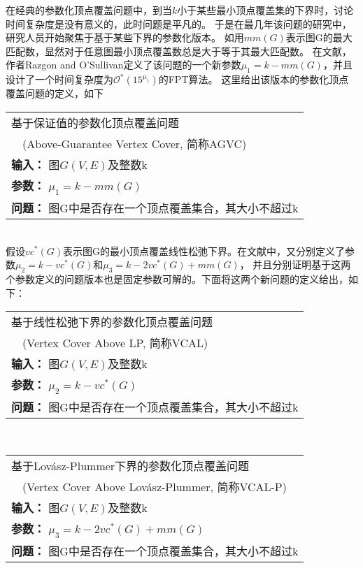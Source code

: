在经典的参数化顶点覆盖问题中，到当$k$小于某些最小顶点覆盖集的下界时，讨论时间复杂度是没有意义的，此时问题是平凡的。
于是在最几年该问题的研究中，研究人员开始聚焦于基于某些下界的参数化版本。
如用$mm(G)$表示图G的最大匹配数，显然对于任意图最小顶点覆盖数总是大于等于其最大匹配数。
在文献\cite{razgon2009almost}，作者Razgon and O'Sullivan定义了该问题的一个新参数$\mu_1 = k - mm(G)$，并且设计了一个时间复杂度为$\mathcal{O}^*(15^{\mu_1})$的FPT算法。
这里给出该版本的参数化顶点覆盖问题的定义，如下\\

\begin{tabular}{| p{0.9\headwidth} |}
  \hline
  基于保证值的参数化顶点覆盖问题 \\ \ \ (Above-Guarantee Vertex Cover, 简称AGVC) \\
  \textbf{输入：} 图$G(V, E)$及整数k \\
  \textbf{参数：} $\mu_1 = k - mm(G)$\\
  \textbf{问题：} 图G中是否存在一个顶点覆盖集合，其大小不超过k\\
  \hline
\end{tabular} \vspace{0.5cm} \\
假设$vc^*(G)$表示图G的最小顶点覆盖线性松弛下界。在文献\cite{narayanaswamy2012lp, garg2015raising}中，又分别定义了参数$\mu_2 = k - vc^*(G)$和$\mu_3 = k - 2vc^*(G) + mm(G)$，
并且分别证明基于这两个参数定义的问题版本也是固定参数可解的。下面将这两个新问题的定义给出，如下： \\

\begin{tabular}{| p{0.9\headwidth} |}
  \hline
  基于线性松弛下界的参数化顶点覆盖问题 \\ \ \ (Vertex Cover Above LP, 简称VCAL) \\
  \textbf{输入：} 图$G(V, E)$及整数k \\
  \textbf{参数：} $\mu_2 = k - vc^*(G)$\\
  \textbf{问题：} 图G中是否存在一个顶点覆盖集合，其大小不超过k\\
  \hline
\end{tabular} \vspace{0.5cm} \\

\begin{tabular}{| p{0.9\headwidth} |}
  \hline
  基于Lov\'asz-Plummer下界的参数化顶点覆盖问题 \\ \ \ (Vertex Cover Above Lov\'asz-Plummer, 简称VCAL-P) \\
  \textbf{输入：} 图$G(V, E)$及整数k \\
  \textbf{参数：} $\mu_3 = k - 2vc^*(G) + mm(G)$\\
  \textbf{问题：} 图G中是否存在一个顶点覆盖集合，其大小不超过k\\
  \hline
\end{tabular} \vspace{0.5cm} \\

